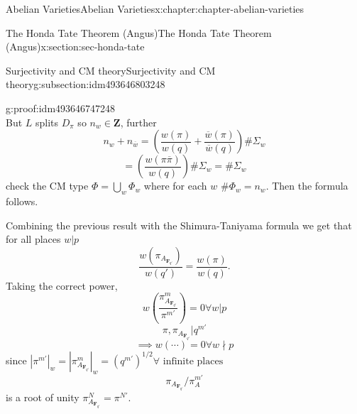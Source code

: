 \documentclass[oneside,10pt,]{book}
\numberwithin{equation}{section}
\newcommand{\ZZ}{\mathbf{Z}}
\newcommand{\FF}{\mathbf{F}}
\begin{document}
\begin{chapterptx}{Abelian Varieties}{}{Abelian Varieties}{}{}{x:chapter:chapter-abelian-varieties}
\begin{sectionptx}{The Honda Tate Theorem (Angus)}{}{The Honda Tate Theorem (Angus)}{}{}{x:section:sec-honda-tate}
\begin{subsectionptx}{Surjectivity and CM theory}{}{Surjectivity and CM theory}{}{}{g:subsection:idm493646803248}
\begin{proofptx}{}{g:proof:idm493646747248}
\begin{equation*}
\end{equation*}
But \(L\) splits \(D_\pi\) so \(n_w \in \ZZ\), further%
\begin{equation*}
n_w + n_{\overline w} = \left( \frac{w(\pi)}{w(q)}  + \frac{\overline w(\pi)}{\overline w(q)} \right) \#\Sigma_w
\end{equation*}
%
\begin{equation*}
= \left( \frac{w(\pi\overline \pi)}{w(q)} \right) \#\Sigma_w = \#\Sigma_w
\end{equation*}
check the CM type \(\Phi = \bigcup_w \Phi_w\) where for each \(w\) \(\# \Phi_w = n_w\). Then the formula follows.%
\end{proofptx}
Combining the previous result with the Shimura-Taniyama formula we get that for all places \(w|p\)%
\begin{equation*}
\frac{w(\pi_{A_{\FF_{q'}}})}{w(q')} = \frac{w(\pi)}{w(q)}\text{.}
\end{equation*}
Taking the correct power,%
\begin{equation*}
w\left( \frac {\pi^m_{A_{\FF_{q'}}}}{\pi^{m'}}\right) = 0 \forall w|p
\end{equation*}
%
\begin{equation*}
\pi,\pi_{A_{\FF_{q'}}}|q^{m'}
\end{equation*}
%
\begin{equation*}
\implies w(\cdots) = 0 \forall w \nmid p
\end{equation*}
since \(|\pi^{m'}|_w = |\pi_{A_{\FF_{q'}}}^m|_w = (q^{m'})^{1/2} \forall \text{ infinite places}\)%
\begin{equation*}
\pi_{A_{\FF_{q'}}}/ \pi_A^{m'}
\end{equation*}
is a root of unity \(\pi^N_{A_{\FF_{q'}}} = \pi^{N'}\).%
\end{subsectionptx}
\end{sectionptx}
\end{chapterptx}
%
%
\typeout{************************************************}
\typeout{************************************************}
%
\end{document}
